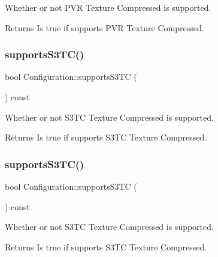 Whether or not P\+VR Texture Compressed is supported.

\begin{DoxyReturn}{Returns}
Is true if supports P\+VR Texture Compressed. 
\end{DoxyReturn}
\mbox{\label{classConfiguration_af641ae5267113baf708ece702a209b3c}} 
\subsubsection{\texorpdfstring{supports\+S3\+T\+C()}{supportsS3TC()}\hspace{0.1cm}{\footnotesize\ttfamily [1/2]}}
{\footnotesize\ttfamily bool Configuration\+::supports\+S3\+TC (\begin{DoxyParamCaption}{ }\end{DoxyParamCaption}) const}

Whether or not S3\+TC Texture Compressed is supported.

\begin{DoxyReturn}{Returns}
Is true if supports S3\+TC Texture Compressed. 
\end{DoxyReturn}
\mbox{\label{classConfiguration_af641ae5267113baf708ece702a209b3c}} 
\subsubsection{\texorpdfstring{supports\+S3\+T\+C()}{supportsS3TC()}\hspace{0.1cm}{\footnotesize\ttfamily [2/2]}}
{\footnotesize\ttfamily bool Configuration\+::supports\+S3\+TC (\begin{DoxyParamCaption}{ }\end{DoxyParamCaption}) const}

Whether or not S3\+TC Texture Compressed is supported.

\begin{DoxyReturn}{Returns}
Is true if supports S3\+TC Texture Compressed. 
\end{DoxyReturn}
\mbox{\label{classConfiguration_acbd9837dcbd01d0e4994dd361b3e7671}} 
